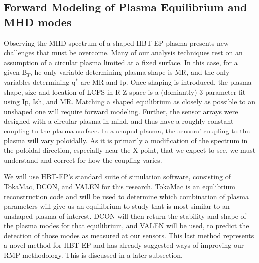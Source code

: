 \documentclass[aps,prl,twocolumn,superscriptaddress,groupedaddress]{revtex4}  %
\begin{document}
	\subsection{Forward Modeling of Plasma Equilibrium and MHD modes}
	Observing the MHD spectrum of a shaped HBT-EP plasma presents new challenges that must be overcome.  Many of our analysis techniques rest on an assumption of a circular plasma limited at a fixed surface.  In this case, for a given B$_T$, he only variable determining plasma shape is MR, and the only variables determining  q$^*$ are MR and Ip. Once shaping is introduced, the plasma shape, size and location of LCFS in R-Z space is a (domiantly) 3-parameter fit using Ip, Ish, and MR.  Matching a shaped equilibrium as closely as possible to an unshaped one will require forward modeling.
	Further, the sensor arrays were designed with a circular plasma in mind, and thus have a roughly constant coupling to the plasma surface.  In a shaped plasma, the sensors' coupling to the plasma will vary poloidally.  As it is primarily a modification of the spectrum in the poloidal direction, especially near the X-point, that we expect to see, we must understand and correct for how the coupling varies.\par 
	We will use HBT-EP's standard suite of simulation software, consisting of TokaMac, DCON, and VALEN for this research.  TokaMac is an equlibrium reconstruction code and will be used to determine which combination of plasma parameters will give us an equilibrium to study that is most similar to an unshaped plasma of interest.  DCON will then return the stability and shape of the plasma modes for that equilibrium, and VALEN will be used, to predict the detection of those modes as measured at our sensors.  This last method represents a novel method for HBT-EP and has already suggested ways of improving our RMP methodology.  This is discussed in a later subsection.
\end{document}
